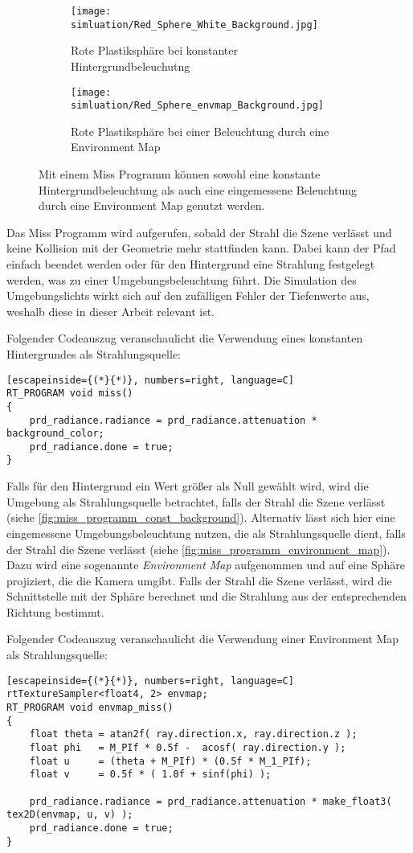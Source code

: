 \documentclass[thesis.tex]{subfiles}
\begin{document}
\begin{figure}[ht!]
\centering
\begin{subfigure}[b]{0.49\textwidth}
\texttt{[image: simluation/Red\_Sphere\_White\_Background.jpg]}
\caption{Rote Plastiksphäre bei konstanter Hintergrundbeleuchutng}
\label{fig:miss_programm_const_background}
\end{subfigure}
\begin{subfigure}[b]{0.49\textwidth}
\texttt{[image: simluation/Red\_Sphere\_envmap\_Background.jpg]}
\caption{Rote Plastiksphäre bei einer Beleuchtung durch eine Environment Map}
\label{fig:miss_programm_environment_map}
\end{subfigure}
\caption{Mit einem Miss Programm können sowohl eine konstante Hintergrundbeleuchtung als auch eine eingemessene Beleuchtung durch eine Environment Map genutzt werden.}
\label{fig:miss_programm}
\end{figure}

Das Miss Programm wird aufgerufen, sobald der Strahl die Szene verlässt und keine Kollision mit der Geometrie mehr stattfinden kann. Dabei kann der Pfad einfach beendet werden oder für den Hintergrund eine Strahlung festgelegt werden, was zu einer Umgebungsbeleuchtung führt. Die Simulation des Umgebungslichts wirkt sich auf den zufälligen Fehler der Tiefenwerte aus, weshalb diese in dieser Arbeit relevant ist.

Folgender Codeauszug veranschaulicht die Verwendung eines konstanten Hintergrundes als Strahlungsquelle:
\begin{lstlisting}[escapeinside={(*}{*)}, numbers=right, language=C]
RT_PROGRAM void miss()
{
    prd_radiance.radiance = prd_radiance.attenuation * background_color;
    prd_radiance.done = true;
}
\end{lstlisting}
%
Falls für den Hintergrund ein Wert größer als Null gewählt wird, wird die Umgebung als Strahlungsquelle betrachtet, falls der Strahl die Szene verlässt (siehe \autoref{fig:miss_programm_const_background}). Alternativ lässt sich hier eine eingemessene Umgebungsbeleuchtung nutzen, die als Strahlungsquelle dient, falls der Strahl die Szene verlässt (siehe \autoref{fig:miss_programm_environment_map}). Dazu wird eine sogenannte \emph{Environment Map} aufgenommen und auf eine Sphäre projiziert, die die Kamera umgibt. Falls der Strahl die Szene verlässt, wird die Schnittstelle mit der Sphäre berechnet und die Strahlung aus der entsprechenden Richtung bestimmt.

Folgender Codeauszug veranschaulicht die Verwendung einer Environment Map als Strahlungsquelle:
\begin{lstlisting}[escapeinside={(*}{*)}, numbers=right, language=C]
rtTextureSampler<float4, 2> envmap;
RT_PROGRAM void envmap_miss()
{
    float theta = atan2f( ray.direction.x, ray.direction.z );
    float phi   = M_PIf * 0.5f -  acosf( ray.direction.y );
    float u     = (theta + M_PIf) * (0.5f * M_1_PIf);
    float v     = 0.5f * ( 1.0f + sinf(phi) );

    prd_radiance.radiance = prd_radiance.attenuation * make_float3( tex2D(envmap, u, v) );
    prd_radiance.done = true;
}
\end{lstlisting}
%
\end{document}
